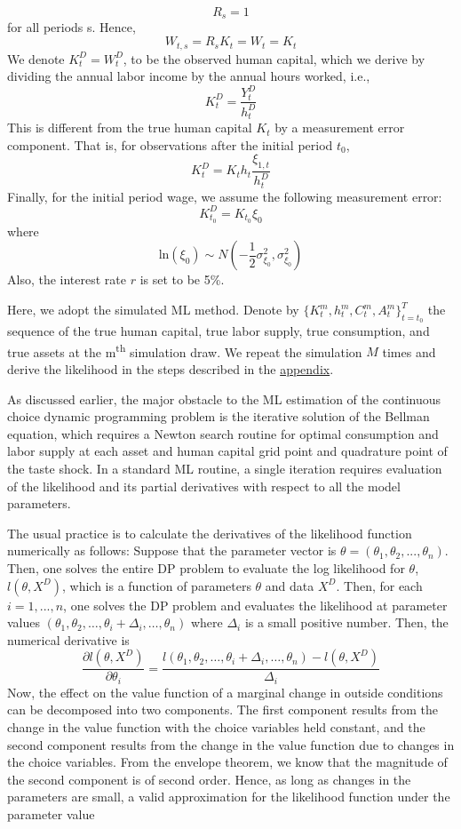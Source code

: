 \documentclass{article}
\begin{document}
    $$ R_s = 1 $$
    for all periods s. Hence,
    $$W_{t,s}=R_s K_t = W_t = K_t $$
    We denote $K_t^D = W_t^D$, to be the observed human capital, which we derive by dividing the annual labor income by the annual hours worked, i.e.,
    $$ K_t^D = \dfrac{Y_t^D}{h_t^D}$$
    This is different from the true human capital $K_t$ by a measurement error component. That is, for observations after the initial period $t_0$,
    $$ K_t^D = K_t h_t \dfrac{\xi_{1,t}}{h_t^D}$$
    Finally, for the initial period wage, we assume the following measurement error:
    $$K_{t_0}^D = K_{t_0} \xi_0$$
    where
    $$\text{ln}(\xi_0) \sim N(-\frac{1}{2} \sigma_{\xi_0}^2,\sigma_{\xi_0}^2)$$
    Also, the interest rate $r$ is set to be 5\%.\par
    Here, we adopt the simulated ML method. Denote by $\{K_t^m, h_t^m, C_t^m, A_t^m\}_{t=t_0}^T$ the sequence of the true human capital, true labor supply, true consumption, and true assets at the m\textsuperscript{th} simulation draw. We repeat the simulation $M$ times and derive the likelihood in the steps described in the \hyperref[appendix]{appendix}. \par
   As discussed earlier, the major obstacle to the ML estimation of the continuous choice dynamic programming problem is the iterative solution of the Bellman equation, which requires a Newton search routine for optimal consumption and labor supply at each asset and human capital grid point and quadrature point of the taste shock. In a standard ML routine, a single iteration requires evaluation of the likelihood and its partial derivatives with respect to all the model parameters. \par
   The usual practice is to calculate the derivatives of the likelihood function numerically as follows: Suppose that the parameter vector is $\theta = (\theta_1, \theta_2,... ,\theta_n)$. Then, one solves the entire DP problem to evaluate the log likelihood for $\theta$, $l(\theta,X^D)$, which is a function of parameters $\theta$ and data $X^D$. Then, for each $i = 1,..., n$, one solves the DP problem and evaluates the likelihood at parameter values $(\theta_1, \theta_2, \dots, \theta_i + \Delta_i, \dots, \theta_n)$ where $\Delta_i$ is a small positive number. Then, the numerical derivative is
   $$\dfrac{\partial l(\theta,X^D)}{\partial \theta_i} = \dfrac{l(\theta_1, \theta_2, \dots, \theta_i + \Delta_i, \dots, \theta_n)- l(\theta,X^D)}{\Delta_i} $$
 Now, the effect on the value function of a marginal change in outside conditions can be decomposed into two components. The first component results from the change in the value function with the choice variables held constant, and the second component results from the change in the value function due to changes in the choice variables. From the envelope theorem, we know that the magnitude of the second component is of second order. Hence, as long as changes in the parameters are small, a valid approximation for the likelihood function under the parameter value
\end{document}
